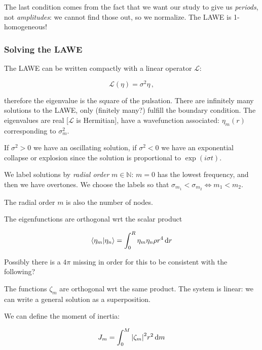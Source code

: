\documentclass[main.tex]{subfiles}
\begin{document}
The last condition comes from the fact that we want our study to give us \emph{periods}, not \emph{amplitudes}: we cannot find those out, so we normalize. The LAWE is 1-homogeneous!

\subsubsection{Solving the LAWE}

The LAWE can be written compactly with a linear operator \(\mathcal L\):

\begin{equation}
  \mathcal L (\eta) = \sigma^2 \eta\,,
\end{equation}

therefore the eigenvalue is the square of the pulsation.
There are infinitely many solutions to the LAWE, only (finitely many?) fulfill the boundary condition.
The eigenvalues are real [\(\mathcal L\) is Hermitian], have a wavefunction associated: \(\eta_m (r)\) corresponding to \(\sigma_m ^2\).

If \(\sigma^2 > 0\) we have an oscillating solution, if \(\sigma^2 <0 \) we have an exponential collapse or explosion since the solution is proportional to \(\exp(i \sigma t)\).

We label solutions by \emph{radial order} \(m \in \mathbb{N}\): \(m=0\) has the lowest frequency, and then we have overtones.
We choose the labels so that \(\sigma_{m_1} < \sigma_{m_2} \iff m_1 < m_2\).

The radial order \(m\) is also the number of nodes.

The eigenfunctions are orthogonal wrt the scalar product

\begin{equation}
  \braket{\eta_m}{\eta_n} = \int _{0}   ^{R} \eta_m \eta_n \rho r^4 \dd{r}
\end{equation}

\begin{greenbox}
  Possibly there is a \(4 \pi\) missing in order for this to be consistent with the following?
\end{greenbox}

The functions \(\zeta_m\) are orthogonal wrt the same product. The system is linear: we can write a general solution as a superposition.

We can define the moment of inertia:

\begin{equation}
  J_m = \int _{0}   ^{M} \abs{\zeta_m}^2 r^2 \dd{m}
\end{equation}
\end{document}
